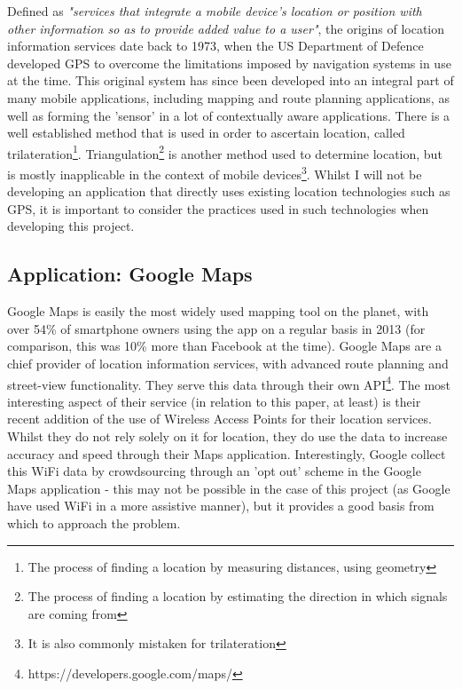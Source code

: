 \documentclass[11pt]{informatics-report}
\begin{document}
Defined as \textit{"services that integrate a mobile device's location or position with other information so as to provide added value to a user"}\cite{schiller2004location}, the origins of location information services date back to 1973, when the US Department of Defence developed GPS to overcome the limitations imposed by navigation systems in use at the time\cite{national1995global}. This original system has since been developed into an integral part of many mobile applications, including mapping and route planning applications, as well as forming the 'sensor' in a lot of contextually aware applications. There is a well established method that is used in order to ascertain location, called trilateration\footnote{The process of finding a location by measuring distances, using geometry}. Triangulation\footnote{The process of finding a location by estimating the direction in which signals are coming from} is another method used to determine location, but is mostly inapplicable in the context of mobile devices\footnote{It is also commonly mistaken for trilateration}. Whilst I will not be developing an application that directly uses existing location technologies such as GPS, it is important to consider the practices used in such technologies when developing this project.

\subsection{Application: Google Maps}

Google Maps is easily the most widely used mapping tool on the planet, with over 54\% of smartphone owners using the app on a regular basis in 2013 (for comparison, this was 10\% more than Facebook at the time)\cite{googlemaps}. Google Maps are a chief provider of location information services, with advanced route planning and street-view functionality. They serve this data through their own API\footnote{https://developers.google.com/maps/}. The most interesting aspect of their service (in relation to this paper, at least) is their recent addition of the use of Wireless Access Points for their location services. Whilst they do not rely solely on it for location, they do use the data to increase accuracy and speed through their Maps application\cite{googleWiFi}. Interestingly, Google collect this WiFi data by crowdsourcing through an 'opt out' scheme in the Google Maps application\cite{googlewifi2} - this may not be possible in the case of this project (as Google have used WiFi in a more assistive manner), but it provides a good basis from which to approach the problem.
\end{document}
